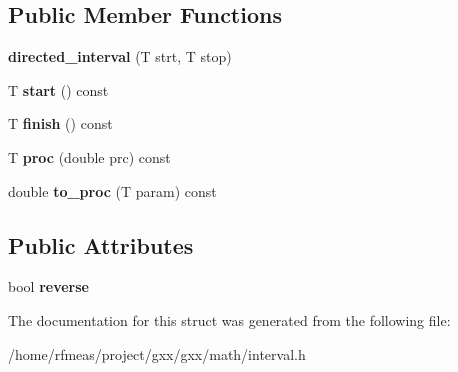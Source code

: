 \subsection*{Public Member Functions}
\begin{DoxyCompactItemize}
\item 
{\bfseries directed\+\_\+interval} (T strt, T stop)\hypertarget{structgxx_1_1math_1_1directed__interval_a56c727a9876226b8323eef2ec8f467f2}{}\label{structgxx_1_1math_1_1directed__interval_a56c727a9876226b8323eef2ec8f467f2}

\item 
T {\bfseries start} () const \hypertarget{structgxx_1_1math_1_1directed__interval_a4a7f41f73a08e7d79ab7a4dd1b040e2d}{}\label{structgxx_1_1math_1_1directed__interval_a4a7f41f73a08e7d79ab7a4dd1b040e2d}

\item 
T {\bfseries finish} () const \hypertarget{structgxx_1_1math_1_1directed__interval_aa966173ddac24be355e4da10fce0d187}{}\label{structgxx_1_1math_1_1directed__interval_aa966173ddac24be355e4da10fce0d187}

\item 
T {\bfseries proc} (double prc) const \hypertarget{structgxx_1_1math_1_1directed__interval_ae816022ac342134d35d5af4c200f0748}{}\label{structgxx_1_1math_1_1directed__interval_ae816022ac342134d35d5af4c200f0748}

\item 
double {\bfseries to\+\_\+proc} (T param) const \hypertarget{structgxx_1_1math_1_1directed__interval_ac74ae93897c07b766cba868777d5f686}{}\label{structgxx_1_1math_1_1directed__interval_ac74ae93897c07b766cba868777d5f686}

\end{DoxyCompactItemize}
\subsection*{Public Attributes}
\begin{DoxyCompactItemize}
\item 
bool {\bfseries reverse}\hypertarget{structgxx_1_1math_1_1directed__interval_a54217a3c25abb1c06c23505cac30fdfd}{}\label{structgxx_1_1math_1_1directed__interval_a54217a3c25abb1c06c23505cac30fdfd}

\end{DoxyCompactItemize}


The documentation for this struct was generated from the following file\+:\begin{DoxyCompactItemize}
\item 
/home/rfmeas/project/gxx/gxx/math/interval.\+h\end{DoxyCompactItemize}
